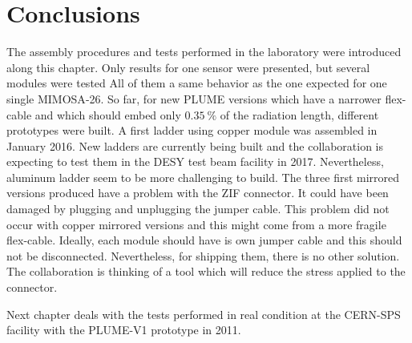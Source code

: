 \section{Conclusions}

  The assembly procedures and tests performed in the laboratory were introduced along this chapter.
  Only results for one sensor were presented, but several modules were tested 
  All of them a same behavior as the one expected for one single \gls{MIMOSA}-26.
  So far, for new \gls{PLUME} versions which have a narrower flex-cable and which should embed only $0.35~\%$ of the radiation length, different prototypes were built. 
  A first ladder using copper module was assembled in January 2016.
  New ladders are currently being built and the collaboration is expecting to test them in the \gls{DESY} test beam facility in 2017.
  Nevertheless, aluminum ladder seem to be more challenging to build.
  The three first mirrored versions produced have a problem with the \gls{ZIF} connector.
  It could have been damaged by plugging and unplugging the jumper cable.
  This problem did not occur with copper mirrored versions and this might come from a more fragile flex-cable.
  Ideally, each module should have is own jumper cable and this should not be disconnected.
  Nevertheless, for shipping them, there is no other solution.
  The collaboration is thinking of a tool which will reduce the stress applied to the connector.

  Next chapter deals with the tests performed in real condition at the CERN-SPS facility with the PLUME-V1 prototype in 2011.
